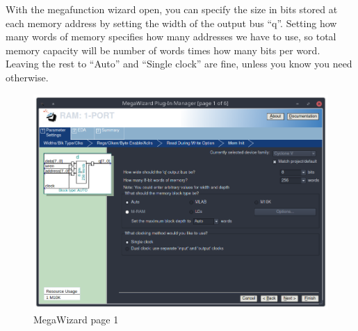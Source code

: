 \documentclass[letter,12pt]{article}
\begin{document}
With the megafunction wizard open, you can specify the size in bits stored at each memory address by setting the width of the output bus ``q''. Setting how many words of memory specifies how many addresses we have to use, so total memory capacity will be number of words times how many bits per word. Leaving the rest to ``Auto'' and ``Single clock'' are fine, unless you know you need otherwise.

\begin{figure}[H]
  \centering
  \includegraphics[width=.83\linewidth]{pics/Mega1.png}
  \caption{MegaWizard page 1}
\end{figure}
\end{document}
